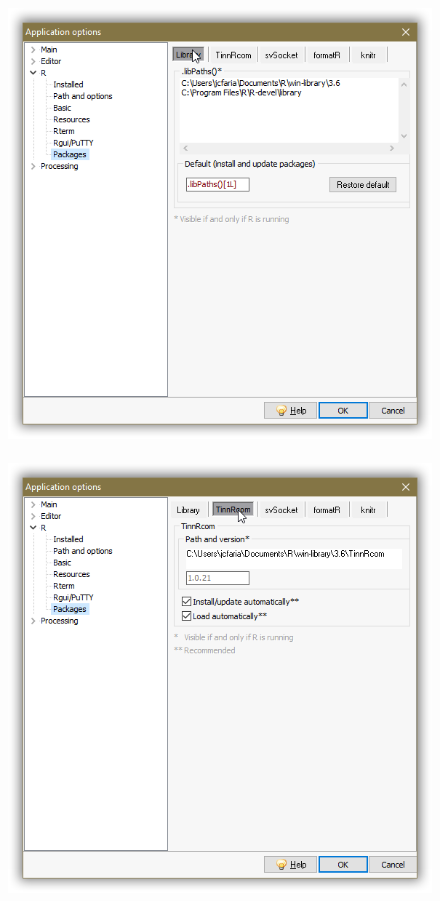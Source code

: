 \begin{figure}[h!]
  \includegraphics[scale=0.33]{./res/app_r_packages_library.png}~~
  \includegraphics[scale=0.33]{./res/app_r_packages_tinnrcom.png}\\

\end{figure}
